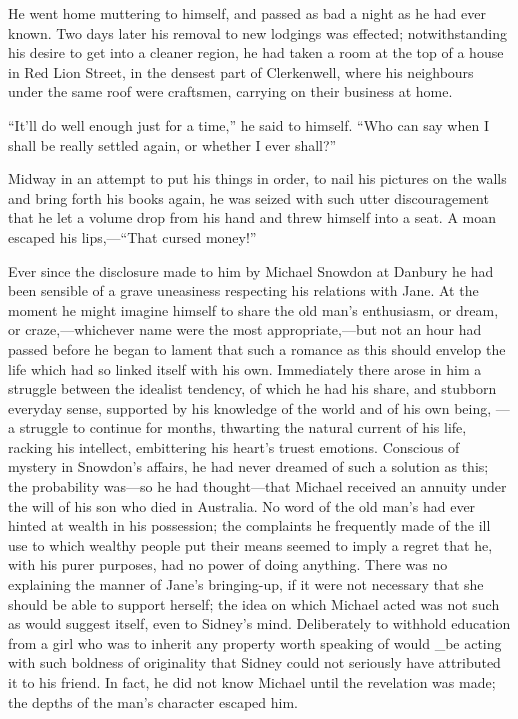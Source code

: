 He went home muttering to himself, and
{\protect\hypertarget{270}{}{}}passed as bad a night as he had ever
known. Two days later his removal to new lodgings was effected;
notwithstanding his desire to get into a cleaner region, he had taken a
room at the top of a house in Red Lion Street, in the densest part of
Clerkenwell, where his neighbours under the same roof were craftsmen,
carrying on their business at home.

``It'll do well enough just for a time,'' he said to himself. ``Who can
say when I shall be really settled again, or whether I ever shall?''

Midway in an attempt to put his things in order, to nail his pictures on
the walls and bring forth his books again, he was seized with such utter
discouragement that he let a volume drop from his hand and threw himself
into a seat. A moan escaped his lips,---``That cursed money!''

Ever since the disclosure made to him by Michael Snowdon at Danbury he
had been sensible of a grave uneasiness respecting his relations with
Jane. At the moment he might imagine himself to share the old man's
{\protect\hypertarget{271}{}{}}enthusiasm, or dream, or
craze,---whichever name were the most appropriate,---but not an hour had
passed before he began to lament that such a romance as this should
envelop the life which had so linked itself with his own. Immediately
there arose in him a struggle between the idealist tendency, of which he
had his share, and stubborn everyday sense, supported by his knowledge
of the world and of his own being, --- a struggle to continue for
months, thwarting the natural current of his life, racking his
intellect, embittering his heart's truest emotions. Conscious of mystery
in Snowdon's affairs, he had never dreamed of such a solution as this;
the probability was---so he had thought---that Michael received an
annuity under the will of his son who died in Australia. No word of the
old man's had ever hinted at wealth in his possession; the complaints he
frequently made of the ill use to which wealthy people put their means
seemed to imply a regret that he, with his purer purposes, had no power
of doing anything. There was no explaining the manner of Jane's
{\protect\hypertarget{272}{}{}}bringing-up, if it were not necessary
that she should be able to support herself; the idea on which Michael
acted was not such as would suggest itself, even to Sidney's mind.
Deliberately to withhold education from a girl who was to inherit any
property worth speaking of would \_be acting with such boldness of
originality that Sidney could not seriously have attributed it to his
friend. In fact, he did not know Michael until the revelation was made;
the depths of the man's character escaped him.

